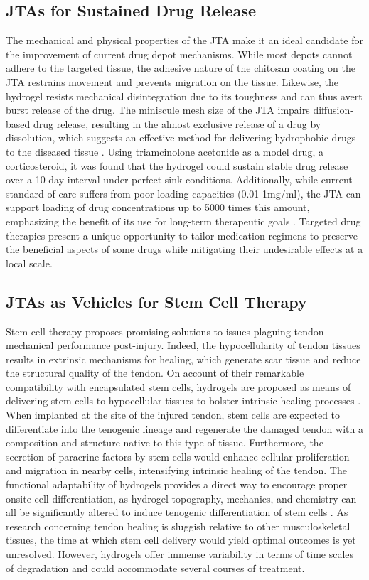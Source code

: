 \subsection{JTAs for Sustained Drug Release}
The mechanical and physical properties of the JTA make it an ideal candidate for the improvement of current drug depot mechanisms. While most depots cannot adhere to the targeted tissue, the adhesive nature of the chitosan coating on the JTA restrains movement and prevents migration on the tissue. Likewise, the hydrogel resists mechanical disintegration due to its toughness and can thus avert burst release of the drug. The miniscule mesh size of the JTA impairs diffusion-based drug release, resulting in the almost exclusive release of a drug by dissolution, which suggests an effective method for delivering hydrophobic drugs to the diseased tissue \autocite{freedmanEnhancedTendonHealing2022}. Using triamcinolone acetonide as a model drug, a corticosteroid, it was found that the hydrogel could sustain stable drug release over a 10-day interval under perfect sink conditions. Additionally, while current standard of care suffers from poor loading capacities (0.01-1mg/ml), the JTA can support loading of drug concentrations up to 5000 times this amount, emphasizing the benefit of its use for long-term therapeutic goals \autocite{freedmanEnhancedTendonHealing2022}. Targeted drug therapies present a unique opportunity to tailor medication regimens to preserve the beneficial aspects of some drugs while mitigating their undesirable effects at a local scale.

\subsection{JTAs as Vehicles for Stem Cell Therapy}
Stem cell therapy proposes promising solutions to issues plaguing tendon mechanical performance post-injury. Indeed, the hypocellularity of tendon tissues results in extrinsic mechanisms for healing, which generate scar tissue and reduce the structural quality of the tendon. On account of their remarkable compatibility with encapsulated stem cells, hydrogels are proposed as means of delivering stem cells to hypocellular tissues to bolster intrinsic healing processes \autocite{intro}. When implanted at the site of the injured tendon, stem cells are expected to differentiate into the tenogenic lineage and regenerate the damaged tendon with a composition and structure native to this type of tissue. Furthermore, the secretion of paracrine factors by stem cells would enhance cellular proliferation and migration in nearby cells, intensifying intrinsic healing of the tendon. The functional adaptability of hydrogels provides a direct way to encourage proper onsite cell differentiation, as hydrogel topography, mechanics, and chemistry can all be significantly altered to induce tenogenic differentiation of stem cells \autocite{intro}. As research concerning tendon healing is sluggish relative to other musculoskeletal tissues, the time at which stem cell delivery would yield optimal outcomes is yet unresolved. However, hydrogels offer immense variability in terms of time scales of degradation and could accommodate several courses of treatment. 